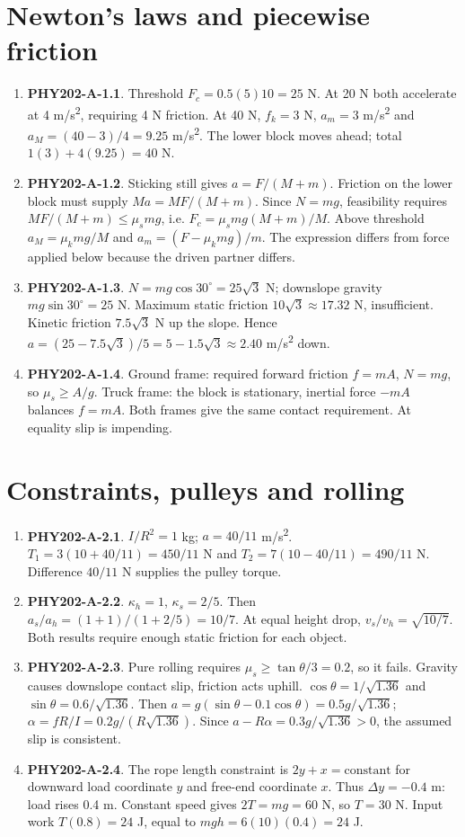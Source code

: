 \documentclass[11pt,a4paper,openany]{book}
\begin{document}
\section{Newton's laws and piecewise friction}
\begin{enumerate}
\item \textbf{PHY202-A-1.1}. Threshold $F_c=0.5(5)10=25$ N. At 20 N both accelerate at 4 m/s\textsuperscript{2}, requiring 4 N friction. At 40 N, $f_k=3$ N, $a_m=3$ m/s\textsuperscript{2} and $a_M=(40-3)/4=9.25$ m/s\textsuperscript{2}. The lower block moves ahead; total $1(3)+4(9.25)=40$ N.
\item \textbf{PHY202-A-1.2}. Sticking still gives $a=F/(M+m)$. Friction on the lower block must supply $Ma=MF/(M+m)$. Since $N=mg$, feasibility requires $MF/(M+m)\le\mu_smg$, i.e. $F_c=\mu_smg(M+m)/M$. Above threshold $a_M=\mu_kmg/M$ and $a_m=(F-\mu_kmg)/m$. The expression differs from force applied below because the driven partner differs.
\item \textbf{PHY202-A-1.3}. $N=mg\cos30^\circ=25\sqrt3$ N; downslope gravity $mg\sin30^\circ=25$ N. Maximum static friction $10\sqrt3\approx17.32$ N, insufficient. Kinetic friction $7.5\sqrt3$ N up the slope. Hence $a=(25-7.5\sqrt3)/5=5-1.5\sqrt3\approx2.40$ m/s\textsuperscript{2} down.
\item \textbf{PHY202-A-1.4}. Ground frame: required forward friction $f=mA$, $N=mg$, so $\mu_s\ge A/g$. Truck frame: the block is stationary, inertial force $-mA$ balances $f=mA$. Both frames give the same contact requirement. At equality slip is impending.
\end{enumerate}
\section{Constraints, pulleys and rolling}
\begin{enumerate}
\item \textbf{PHY202-A-2.1}. $I/R^2=1$ kg; $a=40/11$ m/s\textsuperscript{2}. $T_1=3(10+40/11)=450/11$ N and $T_2=7(10-40/11)=490/11$ N. Difference $40/11$ N supplies the pulley torque.
\item \textbf{PHY202-A-2.2}. $\kappa_h=1$, $\kappa_s=2/5$. Then $a_s/a_h=(1+1)/(1+2/5)=10/7$. At equal height drop, $v_s/v_h=\sqrt{10/7}$. Both results require enough static friction for each object.
\item \textbf{PHY202-A-2.3}. Pure rolling requires $\mu_s\ge\tan\theta/3=0.2$, so it fails. Gravity causes downslope contact slip, friction acts uphill. $\cos\theta=1/\sqrt{1.36}$ and $\sin\theta=0.6/\sqrt{1.36}$. Then $a=g(\sin\theta-0.1\cos\theta)=0.5g/\sqrt{1.36}$; $\alpha=fR/I=0.2g/(R\sqrt{1.36})$. Since $a-R\alpha=0.3g/\sqrt{1.36}>0$, the assumed slip is consistent.
\item \textbf{PHY202-A-2.4}. The rope length constraint is $2y+x=\text{constant}$ for downward load coordinate $y$ and free-end coordinate $x$. Thus $\Delta y=-0.4$ m: load rises 0.4 m. Constant speed gives $2T=mg=60$ N, so $T=30$ N. Input work $T(0.8)=24$ J, equal to $mgh=6(10)(0.4)=24$ J.
\end{enumerate}
\end{document}
